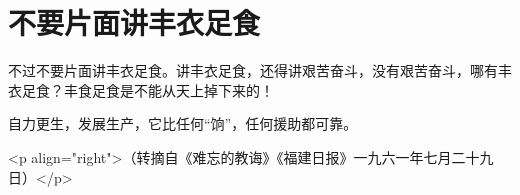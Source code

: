 \section[不要片面讲丰衣足食]{不要片面讲丰衣足食}


不过不要片面讲丰衣足食。讲丰衣足食，还得讲艰苦奋斗，没有艰苦奋斗，哪有丰衣足食？丰食足食是不能从天上掉下来的！

自力更生，发展生产，它比任何“饷”，任何援助都可靠。

<p align="right">（转摘自《难忘的教诲》《福建日报》一九六一年七月二十九日）</p>

